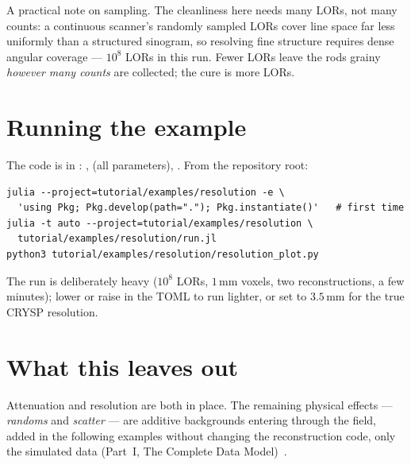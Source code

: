 \documentclass[11pt,a4paper]{article}
\begin{document}
A practical note on sampling. The cleanliness here needs many LORs, not many
counts: a continuous scanner's randomly sampled LORs cover line space far less
uniformly than a structured sinogram, so resolving fine structure requires dense
angular coverage --- $10^8$ LORs in this run. Fewer LORs leave the rods grainy
\emph{however many counts} are collected; the cure is more LORs.

\section{Running the example}
\label{sec:ex-res:run}

The code is in : ,
 (all parameters), . From the
repository root:
\begin{lstlisting}
julia --project=tutorial/examples/resolution -e \
  'using Pkg; Pkg.develop(path="."); Pkg.instantiate()'   # first time
julia -t auto --project=tutorial/examples/resolution \
  tutorial/examples/resolution/run.jl
python3 tutorial/examples/resolution/resolution_plot.py
\end{lstlisting}
The run is deliberately heavy ($10^8$ LORs, $1\,\mathrm{mm}$ voxels, two
reconstructions, a few minutes); lower  or raise  in
the TOML to run lighter, or set \code{fwhm} to $3.5\,\mathrm{mm}$ for the true
CRYSP resolution.

\section{What this leaves out}
\label{sec:ex-res:next}

Attenuation and resolution are both in place. The remaining physical effects ---
\emph{randoms} and \emph{scatter} --- are additive backgrounds entering through
the \code{contamination} field, added in the following examples without changing
the reconstruction code, only the simulated data (Part~I, The Complete Data
Model)~\cite{crysp2026}.


\end{document}

